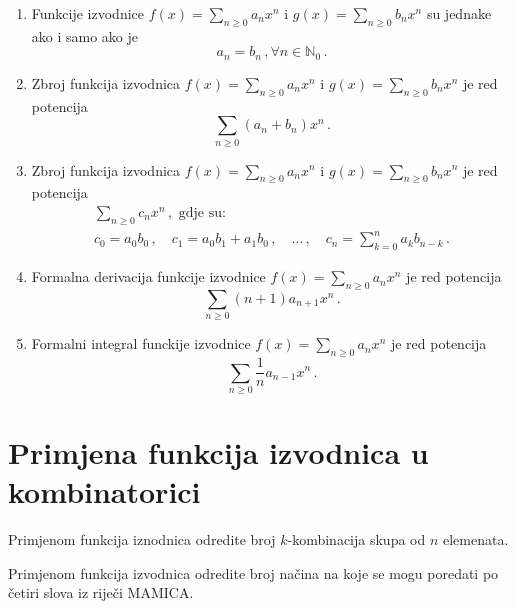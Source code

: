\begin{enumerate}
    \item Funkcije izvodnice $f(x) = \sum_{n\geq 0}a_nx^n$ i
    $g(x) = \sum_{n\geq 0}b_nx^n$ su jednake ako i samo ako je
    $$
        a_n = b_n\,, \forall n \in \mathbb{N}_0\,.
    $$
    \item Zbroj funkcija izvodnica $f(x) = \sum_{n\geq 0} a_nx^n$ i
    $g(x) = \sum_{n\geq 0}b_nx^n$ je red potencija
    $$
        \sum_{n\geq 0} (a_n + b_n)x^n\,.
    $$
    \item Zbroj funkcija izvodnica $f(x) = \sum_{n\geq 0} a_nx^n$ i
    $g(x) = \sum_{n\geq 0}b_nx^n$ je red potencija
    \begin{gather*}
        \sum_{n\geq 0} c_nx^n\,, \text{ gdje su:}\\
        c_0=a_0b_0\,,\quad c_1 = a_0b_1 + a_1b_0\,,\quad \dots\,,\quad c_n = \sum_{k=0}^n a_kb_{n-k}\,.
    \end{gather*}

    \item Formalna derivacija funkcije izvodnice $f(x) = \sum_{n\geq 0} a_nx^n$ je red potencija
    $$
        \sum_{n\geq 0} (n+1)a_{n+1}x^n\,.
    $$
    \item Formalni integral funckije izvodnice $f(x) = \sum_{n\geq 0} a_n x^n$ je red potencija
    $$
        \sum_{n\geq 0} \frac{1}{n} a_{n-1}x^n\,.
    $$
\end{enumerate}

\section{Primjena funkcija izvodnica u kombinatorici}

\begin{example}
    Primjenom funkcija iznodnica odredite broj $k$-kombinacija skupa od $n$ elemenata.
\end{example}

\begin{example}
    Primjenom funkcija izvodnica odredite broj načina na koje se mogu poredati po četiri slova iz riječi $\mathrm{MAMICA}$.
\end{example}
